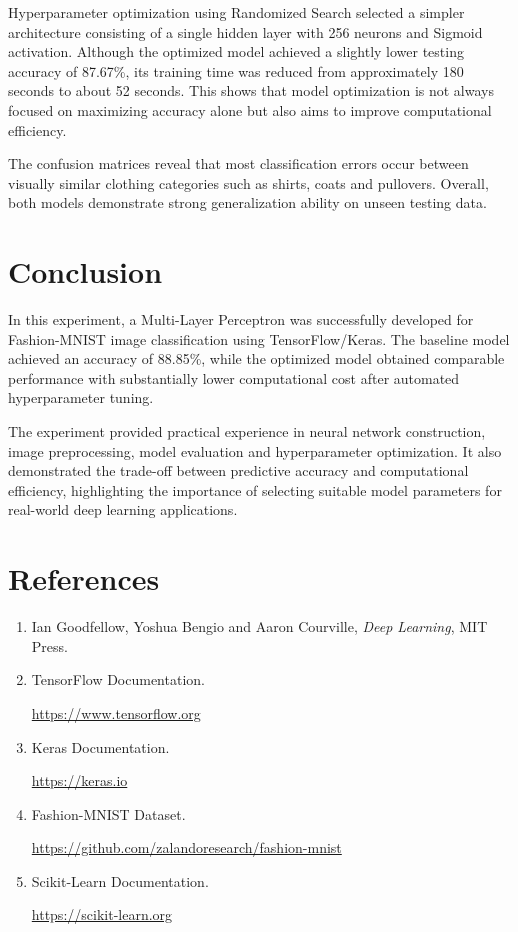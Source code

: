 \documentclass[12pt,a4paper]{article}
\begin{document}
Hyperparameter optimization using Randomized Search selected a simpler architecture consisting of a single hidden layer with 256 neurons and Sigmoid activation. Although the optimized model achieved a slightly lower testing accuracy of 87.67\%, its training time was reduced from approximately 180 seconds to about 52 seconds. This shows that model optimization is not always focused on maximizing accuracy alone but also aims to improve computational efficiency.

The confusion matrices reveal that most classification errors occur between visually similar clothing categories such as shirts, coats and pullovers. Overall, both models demonstrate strong generalization ability on unseen testing data.

\section{Conclusion}

In this experiment, a Multi-Layer Perceptron was successfully developed for Fashion-MNIST image classification using TensorFlow/Keras. The baseline model achieved an accuracy of 88.85\%, while the optimized model obtained comparable performance with substantially lower computational cost after automated hyperparameter tuning.

The experiment provided practical experience in neural network construction, image preprocessing, model evaluation and hyperparameter optimization. It also demonstrated the trade-off between predictive accuracy and computational efficiency, highlighting the importance of selecting suitable model parameters for real-world deep learning applications.

\section{References}

\begin{enumerate}

\item Ian Goodfellow, Yoshua Bengio and Aaron Courville, \textit{Deep Learning}, MIT Press.

\item TensorFlow Documentation.

\url{https://www.tensorflow.org}

\item Keras Documentation.

\url{https://keras.io}

\item Fashion-MNIST Dataset.

\url{https://github.com/zalandoresearch/fashion-mnist}

\item Scikit-Learn Documentation.

\url{https://scikit-learn.org}

\end{enumerate}
\end{document}
